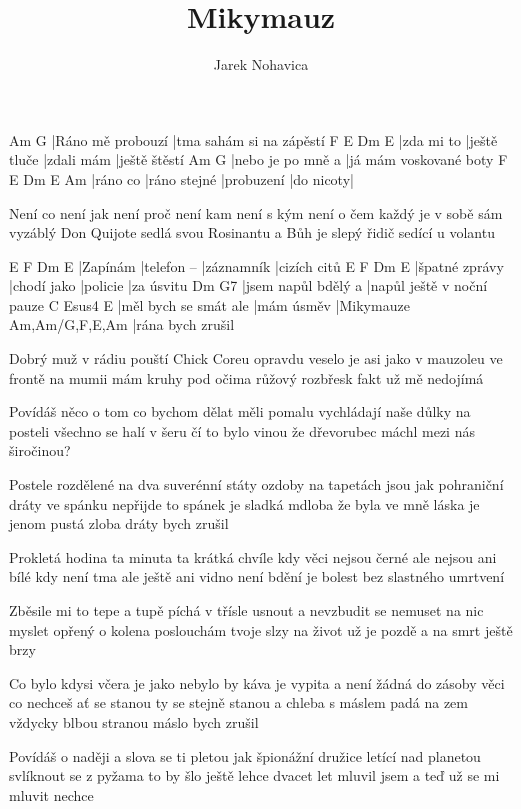\documentclass{song}
\title{Mikymauz}
\author{Jarek Nohavica}
\begin{document}
\begin{multicols}{2}

\strophe
Am                G
|Ráno mě probouzí |tma sahám si na zápěstí
F          E            Dm         E
|zda mi to |ještě tluče |zdali mám |ještě štěstí
Am                G
|nebo je po mně a |já mám voskované boty
F        E            Dm         E         Am
|ráno co |ráno stejné |probuzení |do nicoty|
\endstrophe

\strophe*
Není co není jak není proč není kam
není s kým není o čem každý je v sobě sám
vyzáblý Don Quijote sedlá svou Rosinantu
a Bůh je slepý řidič sedící u volantu
\endstrophe

E        F           Dm         E
|Zapínám |telefon -- |záznamník |cizích citů
E              F           Dm       E
|špatné zprávy |chodí jako |policie |za úsvitu
Dm                  G7
|jsem napůl bdělý a |napůl ještě v noční pauze
C                     Esus4      E
|měl bych se smát ale |mám úsměv |Mikymauze
Am,Am/G,F,E,Am
|rána bych zrušil
\endstrophe

\strophe*
Dobrý muž v rádiu pouští Chick Coreu
opravdu veselo je asi jako v mauzoleu
ve frontě na mumii mám kruhy pod očima
růžový rozbřesk fakt už mě nedojímá
\endstrophe

\strophe*
Povídáš něco o tom co bychom dělat měli
pomalu vychládají naše důlky na posteli
všechno se halí v šeru čí to bylo vinou
že dřevorubec máchl mezi nás širočinou?
\endstrophe

Postele rozdělené na dva suverénní státy
ozdoby na tapetách jsou jak pohraniční dráty
ve spánku nepřijde to spánek je sladká mdloba
že byla ve mně láska je jenom pustá zloba
dráty bych zrušil
\endstrophe

\columnbreak

\strophe*
Prokletá hodina ta minuta ta krátká chvíle
kdy věci nejsou černé ale nejsou ani bílé
kdy není tma ale ještě ani vidno není
bdění je bolest bez slastného umrtvení
\endstrophe

\strophe*
Zběsile mi to tepe a tupě píchá v třísle
usnout a nevzbudit se nemuset na nic myslet
opřený o kolena poslouchám tvoje slzy
na život už je pozdě a na smrt ještě brzy
\endstrophe

Co bylo kdysi včera je jako nebylo by
káva je vypita a není žádná do zásoby
věci co nechceš ať se stanou ty se stejně stanou
a chleba s máslem padá na zem vždycky blbou stranou
máslo bych zrušil
\endstrophe

\strophe*
Povídáš o naději a slova se ti pletou
jak špionážní družice letící nad planetou
svlíknout se z pyžama to by šlo ještě lehce
dvacet let mluvil jsem a teď už se mi mluvit nechce
\endstrophe


\end{multicols}
\end{document}
